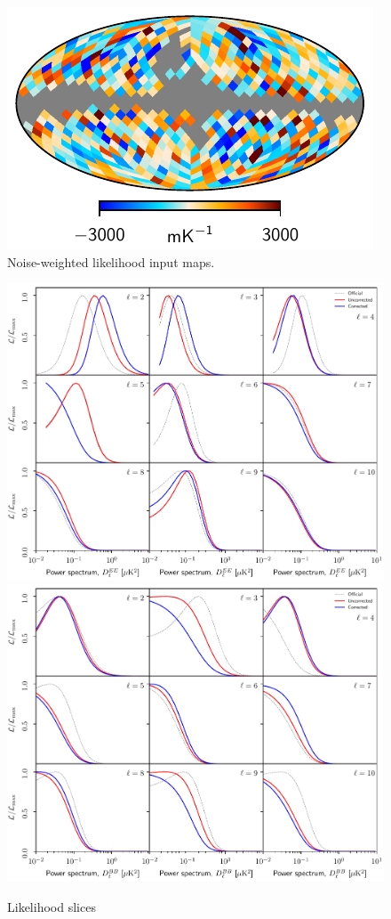 \documentclass[twocolumn]{../../common/aa}
\begin{document}
\begin{figure}[t]
        \includegraphics[width=0.49\linewidth]{figures/wmap_reprod_tempcorr_KaQV_9yr_u_scale.pdf}
	\caption{Noise-weighted likelihood input maps.}
	\label{fig:likelihood_maps}
\end{figure}


\begin{figure}[t]
  	\centering
	\includegraphics[width=\linewidth]{figures/lnL_EE_v1.pdf}
        \includegraphics[width=\linewidth]{figures/lnL_BB_v1.pdf}
	\caption{Likelihood slices}
	\label{fig:lnL}
\end{figure}
\end{document}
